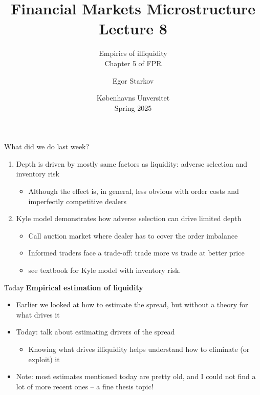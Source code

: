 \documentclass[english,10pt
,aspectratio=169
]{beamer}
\title{Financial Markets Microstructure \\ Lecture 8}
\subtitle{Empirics of illiquidity\\
	Chapter 5 of FPR}
\author{Egor Starkov}
\date{K{\o}benhavns Unversitet \\
	Spring 2025}
\begin{document}
	

\frame[plain]{\titlepage}


\begin{frame}{What did we do last week?}
	\begin{enumerate}
		\item Depth is driven by mostly same factors as liquidity: adverse selection and inventory risk
		\begin{itemize}
			\item Although the effect is, in general, less obvious with order costs and imperfectly competitive dealers
		\end{itemize}
		\item Kyle model demonstrates how adverse selection can drive limited depth
		\begin{itemize}
			\item Call auction market where dealer has to cover the order imbalance
			\item Informed traders face a trade-off: trade more vs trade at better price
			\item see textbook for Kyle model with inventory risk.
		\end{itemize}
	\end{enumerate}
\end{frame}


\begin{frame}{Today}
	\textbf{Empirical estimation of liquidity}
	\begin{itemize}
		\item Earlier we looked at how to estimate the spread, but without a theory for what drives it
		\item Today: talk about estimating drivers of the spread
		\begin{itemize}
			\item Knowing what drives illiquidity helps understand how to eliminate (or exploit) it
		\end{itemize}
		\item Note: most estimates mentioned today are pretty old, and I could not find a lot of more recent ones -- a fine thesis topic!
	\end{itemize}
\end{frame}
\end{document}
